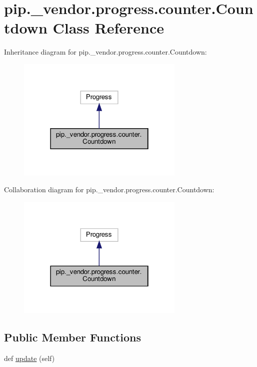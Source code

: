 \hypertarget{classpip_1_1__vendor_1_1progress_1_1counter_1_1Countdown}{}\section{pip.\+\_\+vendor.\+progress.\+counter.\+Countdown Class Reference}
\label{classpip_1_1__vendor_1_1progress_1_1counter_1_1Countdown}


Inheritance diagram for pip.\+\_\+vendor.\+progress.\+counter.\+Countdown\+:
\nopagebreak
\begin{figure}[H]
\begin{center}
\leavevmode
\includegraphics[width=226pt]{classpip_1_1__vendor_1_1progress_1_1counter_1_1Countdown__inherit__graph}
\end{center}
\end{figure}


Collaboration diagram for pip.\+\_\+vendor.\+progress.\+counter.\+Countdown\+:
\nopagebreak
\begin{figure}[H]
\begin{center}
\leavevmode
\includegraphics[width=226pt]{classpip_1_1__vendor_1_1progress_1_1counter_1_1Countdown__coll__graph}
\end{center}
\end{figure}
\subsection*{Public Member Functions}
\begin{DoxyCompactItemize}
\item 
def \hyperlink{classpip_1_1__vendor_1_1progress_1_1counter_1_1Countdown_a3488ef039b3b0f97853fdde0560f2749}{update} (self)
\end{DoxyCompactItemize}


